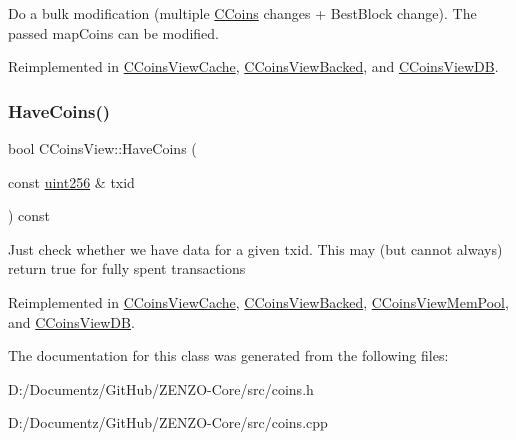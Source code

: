 Do a bulk modification (multiple \mbox{\hyperlink{class_c_coins}{C\+Coins}} changes + Best\+Block change). The passed map\+Coins can be modified. 

Reimplemented in \mbox{\hyperlink{class_c_coins_view_cache_a561bb7c6c97701b12c48fbbb563d0a91}{C\+Coins\+View\+Cache}}, \mbox{\hyperlink{class_c_coins_view_backed_ace15da3934c9d7a9cb9c7a787f92f764}{C\+Coins\+View\+Backed}}, and \mbox{\hyperlink{class_c_coins_view_d_b_a33f98ec9323ce48e1704327bc8a2a002}{C\+Coins\+View\+DB}}.

\mbox{\label{class_c_coins_view_ade3a65fc3f1b02baf7bebce630e4eba3}} 
\subsubsection{\texorpdfstring{HaveCoins()}{HaveCoins()}}
{\footnotesize\ttfamily bool C\+Coins\+View\+::\+Have\+Coins (\begin{DoxyParamCaption}\item[{const \mbox{\hyperlink{classuint256}{uint256}} \&}]{txid }\end{DoxyParamCaption}) const\hspace{0.3cm}{\ttfamily [virtual]}}

Just check whether we have data for a given txid. This may (but cannot always) return true for fully spent transactions 

Reimplemented in \mbox{\hyperlink{class_c_coins_view_cache_aa8f0c55b6fc207d2188948a565125ab7}{C\+Coins\+View\+Cache}}, \mbox{\hyperlink{class_c_coins_view_backed_ad49041658bdec807d556e080476e6543}{C\+Coins\+View\+Backed}}, \mbox{\hyperlink{class_c_coins_view_mem_pool_a2c5900448dc5570053060686ad1f014b}{C\+Coins\+View\+Mem\+Pool}}, and \mbox{\hyperlink{class_c_coins_view_d_b_af55f35faadeb74b5406559fe3ed20114}{C\+Coins\+View\+DB}}.



The documentation for this class was generated from the following files\+:\begin{DoxyCompactItemize}
\item 
D\+:/\+Documentz/\+Git\+Hub/\+Z\+E\+N\+Z\+O-\/\+Core/src/coins.\+h\item 
D\+:/\+Documentz/\+Git\+Hub/\+Z\+E\+N\+Z\+O-\/\+Core/src/coins.\+cpp\end{DoxyCompactItemize}
